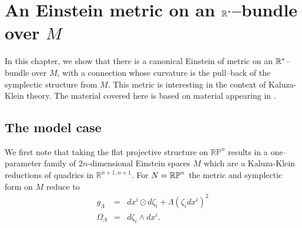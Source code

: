 
\chapter{An Einstein metric on an $\mathbb{R}^*$--bundle over $M$}
\label{chap:KK_lift}
In this chapter, we show that there is a canonical Einstein of metric on an $\mathbb{R}^*$--bundle over $M$, with a connection whose curvature is the pull--back
of the symplectic structure from $M$. This metric is interesting in the context of Kaluza-Klein theory. The material covered here is based on material appearing in \cite{DW}.


\section{The model case} \label{sec:quadric}

We first note that taking the flat projective structure on $\mathbb{RP}^{n}$
results in a one--parameter family of $2n$-dimensional Einstein spaces $M$ which are a Kaluza-Klein
reductions of quadrics in $\mathbb{R}^{n+1,n+1}$. For $N=\mathbb{RP}^n$
the metric and symplectic form on $M$ reduce to 
\begin{eqnarray*}
g_{\Lambda} & = &  dx^{i} \odot d\zeta_{i}+\Lambda(\zeta_{i} dx^{i})^{2}\\
\Omega_{\Lambda} & = &  d\zeta_{i}\wedge dx^{i}.
\end{eqnarray*}

